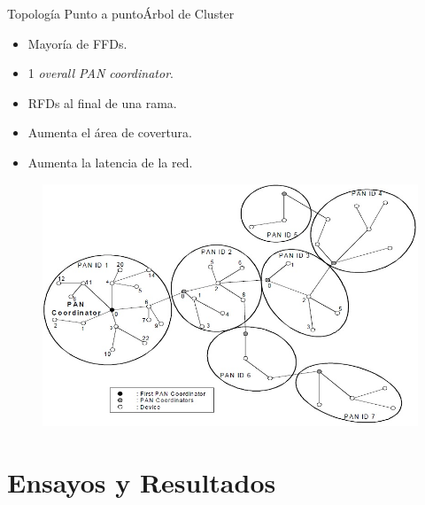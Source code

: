 \documentclass[aspectratio=169, handout]{beamer}
\begin{document}
\begin{frame}{Topología Punto a punto}{Árbol de Cluster}
\begin{minipage}[c]{1.0\linewidth}
\begin{minipage}[c]{0.45\linewidth}
		\begin{itemize}
			\item Mayoría de FFDs.
			\vspace{10px}
			\item 1 \textit{overall PAN coordinator}.
			\vspace{10px}
			\item RFDs al final de una rama.
			\vspace{10px}
			\item Aumenta el área de covertura.
			\vspace{10px}
			\item Aumenta la latencia de la red.
		\end{itemize}	
	\end{minipage}
	\hspace{-15px}
	\begin{minipage}[c]{0.65\linewidth}
		\begin{figure}[H]
			{\includegraphics[width=.8\textwidth]{./imagenes/cluster}}
		\end{figure}	  	  	
	\end{minipage}
\end{minipage}
\end{frame}

\section{Ensayos y Resultados}
\end{document}

